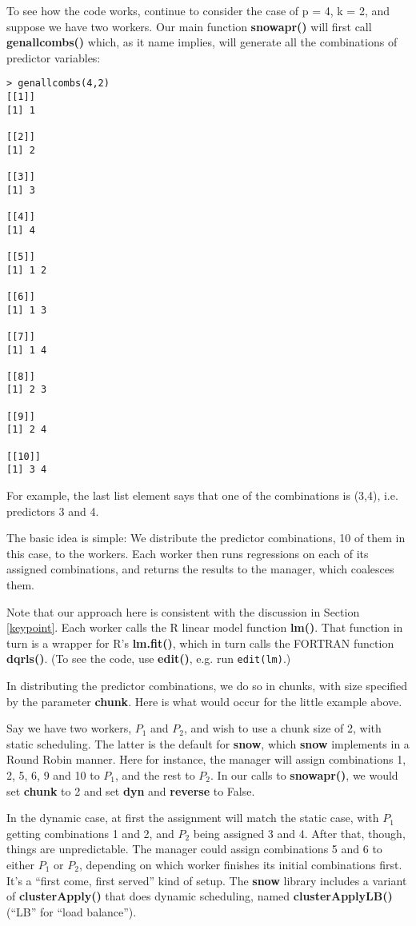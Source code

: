 To see how the code works, continue to consider the case of p = 4, k =
2, and suppose we have two workers.  Our main function {\bf snowapr()} will
first call {\bf genallcombs()} which, as it name implies, will generate
all the combinations of predictor variables:

\begin{Verbatim}[fontsize=\relsize{-1}]
> genallcombs(4,2)
[[1]]
[1] 1

[[2]]
[1] 2

[[3]]
[1] 3

[[4]]
[1] 4

[[5]]
[1] 1 2

[[6]]
[1] 1 3

[[7]]
[1] 1 4

[[8]]
[1] 2 3

[[9]]
[1] 2 4

[[10]]
[1] 3 4
\end{Verbatim}

For example, the last list element says that one of the combinations is
(3,4), i.e. predictors 3 and 4.

The basic idea is simple:  We distribute the predictor combinations, 10
of them in this case, to the workers.  Each worker then runs regressions
on each of its assigned combinations, and returns the results to the
manager, which coalesces them.  

Note that our approach here is consistent with the discussion in Section
\ref{keypoint}.  Each worker calls the R linear model function {\bf
lm()}.  That function in turn is a wrapper for R's {\bf lm.fit()}, which
in turn calls the FORTRAN function {\bf dqrls()}.  (To see the code,
use {\bf edit()}, e.g. run \lstinline{edit(lm)}.)

In distributing the predictor combinations, we do so in chunks, with
size specified by the parameter {\bf chunk}.  Here is what would occur
for the little example above.  

Say we have two workers, $P_1$ and $P_2$, and wish to use a chunk size
of 2, with static scheduling.  The latter is the default for {\bf
snow}, which {\bf snow} implements in a Round Robin manner.  Here for
instance, the manager will assign combinations 1, 2, 5, 6, 9 and 10 to
$P_1$, and the rest to $P_2$.  In our calls to {\bf snowapr()}, we would
set {\bf chunk} to 2 and set {\bf dyn} and {\bf reverse} to False. 

In the dynamic case, at first the assignment will match the static case,
with $P_1$ getting combinations 1 and 2, and $P_2$ being assigned 3 and
4.  After that, though, things are unpredictable.  The manager could
assign combinations 5 and 6 to either $P_1$ or $P_2$, depending on which
worker finishes its initial combinations first.  It's a ``first come,
first served'' kind of setup.  The {\bf snow} library includes a variant
of {\bf clusterApply()} that does dynamic scheduling, named {\bf
clusterApplyLB()} (``LB'' for ``load balance'').

